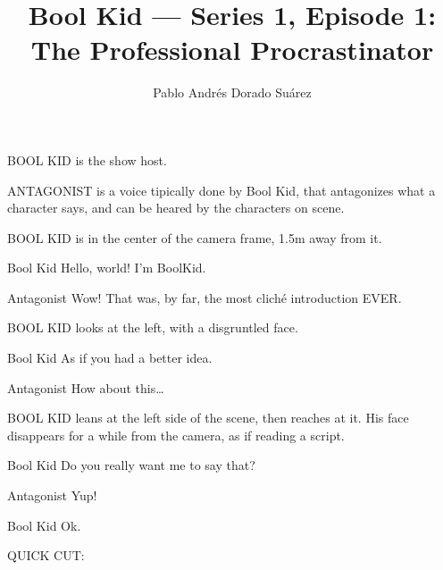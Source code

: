 \documentclass{screenplay}[2018/01/07]
\title{Bool Kid — Series 1, Episode 1: The Professional Procrastinator}
\author{Pablo Andrés Dorado Suárez}
\begin{document}
    \coverpage

    \fadein
    BOOL KID is the show host.

    ANTAGONIST is a voice tipically done by Bool Kid, that antagonizes what a
    character says, and can be heared by the characters on scene.

    \vspace{1em}
    \vspace{2em}


    BOOL KID is in the center of the camera frame, 1.5m away from it.

    \begin{dialogue}{Bool Kid}
        Hello, world! I'm BoolKid.
    \end{dialogue}

    \begin{dialogue}{Antagonist}
        Wow! That was, by far, the most cliché introduction EVER.
    \end{dialogue}

    BOOL KID looks at the left, with a disgruntled face.

    \begin{dialogue}{Bool Kid}
        As if you had a better idea.
    \end{dialogue}

    \begin{dialogue}{Antagonist}
        How about this\dots
    \end{dialogue}

    BOOL KID leans at the left side of the scene, then reaches at it. His face
    disappears for a while from the camera, as if reading a script.

    \begin{dialogue}{Bool Kid}
        Do you really want me to say that?
    \end{dialogue}

    \begin{dialogue}{Antagonist}
        Yup!
    \end{dialogue}

    \begin{dialogue}[sighing]{Bool Kid}
        Ok.
    \end{dialogue}

    \begin{flushright}
        QUICK CUT:
    \end{flushright}
\end{document}
